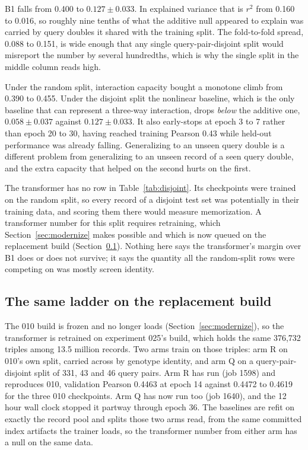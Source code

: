 B1 falls from 0.400 to $0.127 \pm 0.033$. In explained variance that is $r^2$
from 0.160 to 0.016, so roughly nine tenths of what the additive null appeared to
explain was carried by query doubles it shared with the training split. The
fold-to-fold spread, 0.088 to 0.151, is wide enough that any single
query-pair-disjoint split would misreport the number by several hundredths, which
is why the single split in the middle column reads high.

Under the random split, interaction capacity bought a monotone climb from 0.390
to 0.455. Under the disjoint split the nonlinear baseline, which is the only
baseline that can represent a three-way interaction, drops \emph{below} the
additive one, $0.058 \pm 0.037$ against $0.127 \pm 0.033$. It also early-stops at
epoch 3 to 7 rather than epoch 20 to 30, having reached training Pearson 0.43
while held-out performance was already falling. Generalizing to an unseen query
double is a different problem from generalizing to an unseen record of a seen
query double, and the extra capacity that helped on the second hurts on the
first.

The transformer has no row in Table~\ref{tab:disjoint}. Its checkpoints were
trained on the random split, so every record of a disjoint test set was
potentially in their training data, and scoring them there would measure
memorization. A transformer number for this split requires retraining, which
Section~\ref{sec:modernize} makes possible and which is now queued on the
replacement build (Section~\ref{sec:disjoint025}). Nothing here says the
transformer's margin over B1 does or does not survive; it says the quantity all
the random-split rows were competing on was mostly screen identity.

\subsection{The same ladder on the replacement build}
\label{sec:disjoint025}

The 010 build is frozen and no longer loads (Section~\ref{sec:modernize}), so
the transformer is retrained on experiment 025's build, which holds the same
376{,}732 triples among 13.5 million records. Two arms train on those triples:
arm R on 010's own split, carried across by genotype identity, and arm Q on a
query-pair-disjoint split of 331, 43 and 46 query pairs. Arm R has run (job
1598) and reproduces 010, validation Pearson 0.4463 at epoch 14 against 0.4472
to 0.4619 for the three 010 checkpoints. Arm Q has now run too (job 1640), and
the 12 hour wall clock stopped it partway through epoch 36. The baselines are
refit on exactly the record pool and splits those
two arms read, from the same committed index artifacts the trainer loads, so the
transformer number from either arm has a null on the same data.

